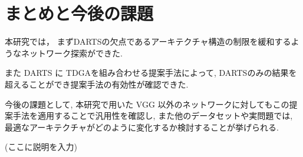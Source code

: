 \newpage
\changeindent{0cm}
\section{まとめと今後の課題}
\label{sec:conclusion}
\changeindent{2cm}

本研究では，
まずDARTSの欠点であるアーキテクチャ構造の制限を緩和するようなネットワーク探索ができた.

また
DARTS に TDGAを組み合わせる提案手法によって,
DARTSのみの結果を超えることができ提案手法の有効性が確認できた.


今後の課題として,
本研究で用いた VGG 以外のネットワークに対してもこの提案手法を適用することで汎用性を確認し,
また他のデータセットや実問題では, 最適なアーキテクチャがどのように変化するか検討することが挙げられる.

(ここに説明を入力)
